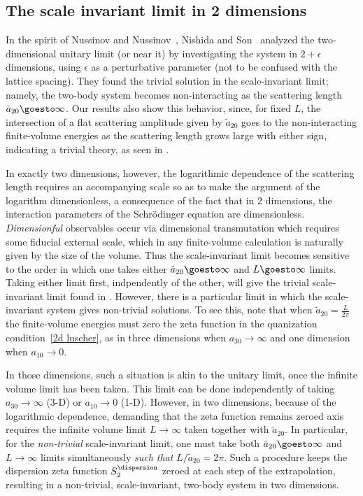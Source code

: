 \subsection{The scale invariant limit in 2 dimensions}

In the spirit of Nussinov and Nussinov~\cite{nussinov2004bcs}, Nishida and Son~\cite{Nishida:2006eu} analyzed the two-dimensional unitary limit (or near it) by investigating the system in $2+\epsilon$ dimensions, using $\epsilon$ as a perturbative parameter (not to be confused with the lattice spacing).
They found the trivial solution in the scale-invariant limit; namely, the two-body system becomes non-interacting as the scattering length $\tilde a_{20} \goesto\infty$.
Our results also show this behavior, since, for fixed $L$, the intersection of a flat scattering amplitude given by $\tilde a_{20}$ goes to the non-interacting finite-volume energies as the scattering length grows large with either sign, indicating a trivial theory, as seen in .

In exactly two dimensions, however, the logarithmic dependence of the scattering length requires an accompanying scale so as to make the argument of the logarithm dimensionless, a consequence of the fact that in 2 dimensions, the interaction parameters of the Schr\"odinger equation are dimensionless.
\emph{Dimensionful} observables occur via dimensional transmutation \cite{} which requires some fiducial external scale, which in any finite-volume calculation is naturally given by the size of the volume.
Thus the scale-invariant limit becomes sensitive to the order in which one takes either $\tilde a_{20}\goesto\infty$ and $L\goesto\infty$ limits.
Taking either limit first, indpendently of the other, will give the trivial scale-invariant limit found in \cite{Nishida:2006eu}.
However, there is a particular limit in which the scale-invariant system gives non-trivial solutions.
To see this, note that when $\tilde a_{20}=\frac{L}{2\pi}$ the finite-volume energies must zero the zeta function in the quanization condition~\eqref{2d luscher}, as in three dimensions when $a_{30}\to\infty$ and one dimension when $a_{10}\to 0$.

In those dimensions, such a situation is akin to the unitary limit, once the infinite volume limit has been taken.
This limit can be done independently of taking $a_{30}\to\infty$ (3-D) or $a_{10}\to0$ (1-D).
However, in two dimensions, because of the logarithmic dependence, demanding that the zeta function remains zeroed axis requires the infinite volume limit $L\to\infty$ taken together with $\tilde a_{20}$.
In particular, for the \emph{non-trivial} scale-invariant limit, one must take both $\tilde a_{20}\goesto \infty$ and $L\to\infty$ limits simultaneously \emph{such that} $L/\tilde a_{20}=2\pi$.
Such a procedure keeps the dispersion zeta function $S^{\dispersion}_2$ zeroed at each step of the extrapolation, resulting in a non-trivial, scale-invariant, two-body system in two dimensions.
